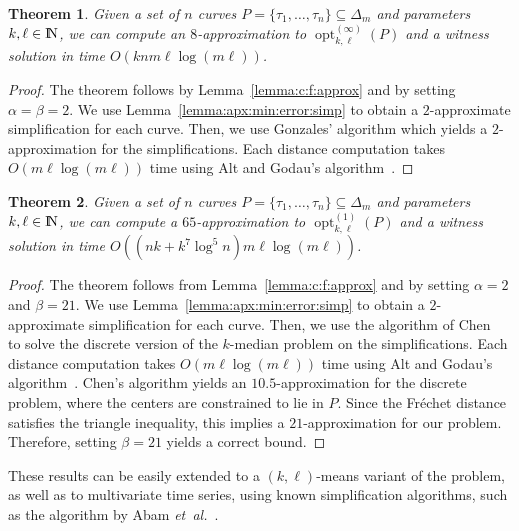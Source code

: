 \documentclass[11pt, letter]{article}
\newcommand{\etal}{\textit{e{}t~a{}l.}\xspace}
\DeclareMathOperator{\opt}{opt}
\newtheorem{theorem}{Theorem}[section]
\newcommand{\thmlab}[1]{{\label{theo:#1}}}
\newcommand{\lemref}[1]{Lemma~\ref{lemma:#1}}
\newcommand{\Frechet}{Fr\'echet\xspace}
\newcommand{\Na}{{\rm I\!\hspace{-0.025em} N}}
\newcommand{\nrClusters}{\ensuremath{k}}
\newcommand{\lenClusters}{\ensuremath{\ell}}
\newcommand{\trajectory}[2]{\ensuremath{{#1}_{#2}}}
\newcommand{\inputSym}{\ensuremath{\tau}}
\newcommand{\inputTraj}[1]{\trajectory{\inputSym}{#1}}
\begin{document}
\begin{theorem}\thmlab{cf:approx:center:main}
Given a set of $n$ curves $P=\lbrace\inputTraj{1},\ldots , \inputTraj{n} \rbrace \subseteq
\Delta_m$ and parameters $\nrClusters,\lenClusters \in \Na$,
we can compute an $8$-approximation to $\opt^{(\infty)}_{\nrClusters,\lenClusters}(P)$
and a witness solution in time $O(\nrClusters n m \lenClusters \log(m
\lenClusters))$.
\end{theorem}
\begin{proof}
The theorem follows by \lemref{c:f:approx} and by setting $\alpha=\beta=2$.  We
use \lemref{apx:min:error:simp} to obtain a $2$-approximate simplification for
each curve.  Then, we use Gonzales' algorithm which yields a $2$-approximation
for the simplifications. Each distance computation takes $O(m\lenClusters
\log(m\lenClusters))$ time using Alt and Godau's algorithm~\cite{ag-cfdbt-95}.
\end{proof}


\begin{theorem}\thmlab{cf:approx:median:main}
Given a set of $n$ curves $P=\lbrace \inputTraj{1},\ldots , \inputTraj{n} \rbrace \subseteq
\Delta_m$ and parameters $\nrClusters,\lenClusters \in \Na$,
we can compute a $65$-approximation to $\opt^{(1)}_{\nrClusters,\lenClusters}(P)$
and a witness solution in time $O((nk+k^7\log^5 n)m\ell \log(m\ell))$.
\end{theorem}
\begin{proof}
The theorem follows from \lemref{c:f:approx} and by setting $\alpha=2$ and
$\beta=21$.  We use \lemref{apx:min:error:simp} to obtain a $2$-approximate
simplification for each curve.  Then, we use the algorithm of
Chen~\cite{c-kmc-09} to solve the discrete version of the $k$-median problem on
the simplifications.  Each distance computation takes $O(m\lenClusters
\log(m\lenClusters))$ time using Alt and Godau's algorithm~\cite{ag-cfdbt-95}.
Chen's algorithm yields an $10.5$-approximation for the discrete problem, where
the centers are constrained to lie in $P$.  Since the \Frechet distance
satisfies the triangle inequality, this implies a $21$-approximation for our
problem. Therefore, setting $\beta=21$ yields a correct bound.
\end{proof}

These results can be easily extended to a $(\nrClusters,\lenClusters)$-means variant
of the problem, as well as to multivariate time series, using known
simplification algorithms, such as the algorithm by Abam \etal~\cite{abh-sals-10}. 
\end{document}
